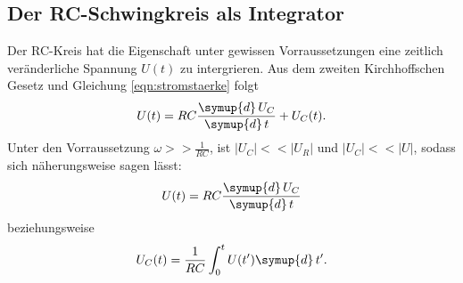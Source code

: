 \subsection{Der RC-Schwingkreis als Integrator}
    Der RC-Kreis hat die Eigenschaft unter gewissen Vorraussetzungen eine zeitlich veränderliche Spannung $U(t)$ zu intergrieren. 
    Aus dem zweiten Kirchhoffschen Gesetz und Gleichung \eqref{eqn:stromstaerke} folgt
    \begin{equation}
        \label{eqn:spannungint}
        U(t) = R C \frac{\symup{d} \, U_C} {\symup{d} \, t} + U_C(t).
    \end{equation}
    Unter den Vorraussetzung $\omega >> \frac{1}{R C}$, ist $\lvert U_C \rvert << \lvert U_R \rvert $ und $\lvert U_C \rvert << \lvert U \rvert $, 
    sodass sich näherungsweise sagen lässt:
    \begin{equation}
        \label{eqn:int1}
        U(t) = R C \frac{\symup{d} \, U_C} {\symup{d} \, t}
    \end{equation}
    beziehungsweise
    \begin{equation}
        \label{eqn:int2}
        U_C(t) = \frac {1} {R C} \int_0^{t} U(t') \symup{d} \, t'.    
    \end{equation}    